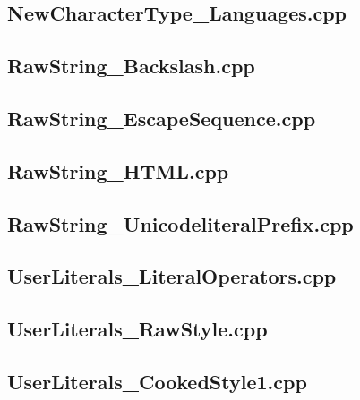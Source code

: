 \documentclass[11pt]{report}
\begin{document}
\begin{appendix}
\subsection{NewCharacterType\_Languages.cpp}
\label{NewCharacterType_Languages}


\subsection{RawString\_Backslash.cpp}
\label{RawString_Backslash}


\subsection{RawString\_EscapeSequence.cpp}
\label{RawString_EscapeSequence}


\subsection{RawString\_HTML.cpp}
\label{RawString_HTML}


\subsection{RawString\_UnicodeliteralPrefix.cpp}
\label{RawString_UnicodeliteralPrefix}


\subsection{UserLiterals\_LiteralOperators.cpp}
\label{UserLiterals_LiteralOperators}


\subsection{UserLiterals\_RawStyle.cpp}
\label{UserLiterals_RawStyle}


\subsection{UserLiterals\_CookedStyle1.cpp}
\label{UserLiterals_CookedStyle1}



\end{appendix}
\end{document}

